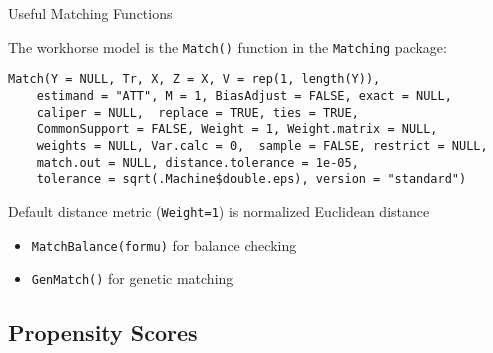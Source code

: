 \documentclass{beamer}
\numberwithin{equation}{section}
\begin{document}
\begin{frame}[fragile]{Useful Matching Functions}

The workhorse model is the \texttt{Match()} function in the
\texttt{Matching} package:

\small
\begin{verbatim}
Match(Y = NULL, Tr, X, Z = X, V = rep(1, length(Y)), 
    estimand = "ATT", M = 1, BiasAdjust = FALSE, exact = NULL, 
    caliper = NULL,  replace = TRUE, ties = TRUE, 
    CommonSupport = FALSE, Weight = 1, Weight.matrix = NULL, 
    weights = NULL, Var.calc = 0,  sample = FALSE, restrict = NULL, 
    match.out = NULL, distance.tolerance = 1e-05, 
    tolerance = sqrt(.Machine$double.eps), version = "standard") 
\end{verbatim}

Default distance metric (\texttt{Weight=1}) is normalized Euclidean distance

\begin{itemize}
\itemsep1pt\parskip0pt
\item
  \texttt{MatchBalance(formu)} for balance checking
\item
  \texttt{GenMatch()} for genetic matching
\end{itemize}

\end{frame}

\subsection{Propensity Scores}\label{propensity-scores}

%
%
%
%
%
\end{document}
